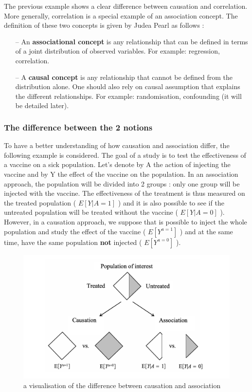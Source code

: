 \documentclass{article}
\begin{document}
The previous example shows a clear difference between causation and correlation. More generally, correlation is a special example of an association concept. The definition of these two concepts is given by Judea Pearl\cite{pearl2010mathematics, pearl2009causal} as follows :

\begin{itemize}
\item[--] An \textbf{associational concept} is any relationship that can be defined in terms of a joint distribution of observed variables. For example: regression, correlation.
\item[--] A \textbf{causal concept} is any relationship that cannot be defined from the distribution alone. One should also rely on causal assumption that explains the different relationships. For example: randomisation, confounding (it will be detailed later).
\end{itemize}


	\subsubsection{The difference between the 2 notions}

To have a better understanding of how causation and association differ, the following example is considered. The goal of a study is to test the effectiveness of a vaccine on a sick population. Let's denote by A the action of injecting the vaccine and by Y the effect of the vaccine on the population. In an association approach, the population will be divided into 2 groups : only one group will be injected with the vaccine. The effectiveness of the treatment is thus measured on the treated population ( $E[Y|A = 1]$ ) and it is also possible to see if the untreated population will be treated without the vaccine ( $E[Y|A = 0]$ ). However, in a causation approach, we suppose that is possible to inject the whole population and study the effect of the vaccine ( $E[Y^{a=1}]$ ) and at the same time, have the same population \textbf{not} injected ( $E[Y^{a=0}]$ ).

\begin{figure}[h]
\centering
\includegraphics[width=0.6 \textwidth]{figures/asso_caus.png}
\caption{a visualisation of the difference between causation and association}
\end{figure}
\end{document}
